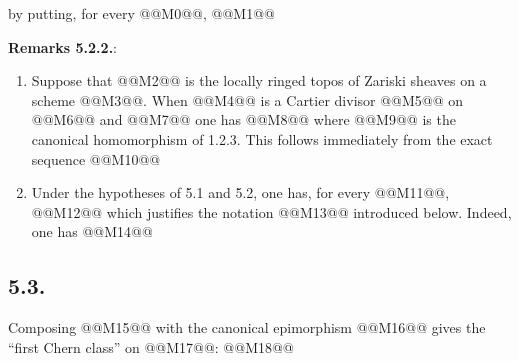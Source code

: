 
by putting, for every @@M0@@,
@@M1@@

\textbf{Remarks 5.2.2.}:
\begin{enumerate}[label=\alph*)]
\item Suppose that @@M2@@ is the locally ringed topos of Zariski sheaves on a scheme @@M3@@. When @@M4@@ is a Cartier divisor @@M5@@ on @@M6@@ and
@@M7@@
one has
@@M8@@
where @@M9@@ is the canonical homomorphism of 1.2.3. This follows immediately from the exact sequence
@@M10@@

\item Under the hypotheses of 5.1 and 5.2, one has, for every @@M11@@,
@@M12@@
which justifies the notation @@M13@@ introduced below. Indeed, one has
@@M14@@
\end{enumerate}

\subsection*{5.3.}
Composing @@M15@@ with the canonical epimorphism
@@M16@@
gives the ``first Chern class'' on @@M17@@:
@@M18@@

